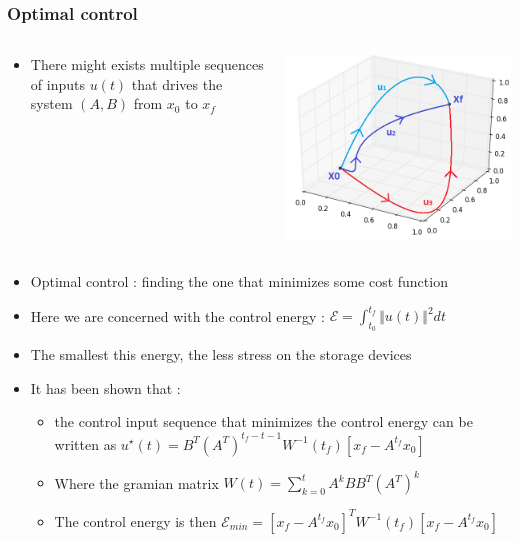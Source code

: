 \documentclass[xcolor=dvipsnames]{beamer}
\begin{document}
\begin{frame}
	\frametitle{Optimal control}
	
	\begin{columns}
		\begin{column}{.7\textwidth}
			\begin{itemize}
			\item There might exists multiple sequences of inputs $ u(t) $ that drives the system $(A,B)$ from $x_0$ to $x_f$
			\end{itemize}
		\end{column}
		\begin{column}{.3\textwidth}
			\includegraphics[scale=.3]{trajectories}
		\end{column}
	\end{columns}
	\begin{itemize}
		\item Optimal control : finding the one that minimizes some cost function
		\item Here we are concerned with the control energy : $ \mathcal{E} = \int_{t_0}^{t_f} \Vert u(t) \Vert^2 dt $
		\item The smallest this energy, the less stress on the storage devices
		\item It has been shown that :
		\begin{itemize}
			\item the control input sequence that minimizes the control energy can be written as $u^{\star}(t) =B^T(A^T)^{t_f-t-1}W^{-1}(t_f) \left[ x_f - A^{t_f}x_0 \right] $ 
			\item Where the gramian matrix $ W(t) = \sum_{k=0}^{t} A^kBB^T(A^T)^k $
			\item The control energy is then $ \mathcal{E}_{min}= \left[ x_f - A^{t_f}x_0 \right]^{T}W^{-1}(t_f)\left[ x_f - A^{t_f}x_0 \right] $
		\end{itemize}
	\end{itemize}
\end{frame}
\end{document}

